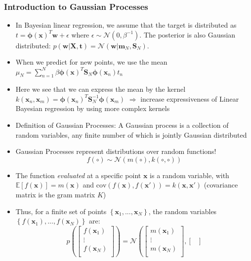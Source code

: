 \subsubsection{Introduction to Gaussian Processes}
\begin{itemize}
	\item In Bayesian linear regression, we assume that the target is distributed as $t=\bm{\phi}\left(\bm{x}\right)^T \bm{w} + \epsilon$ where $\epsilon\sim\mathcal{N}(0,\beta^{-1})$. The posterior is also Gaussian distributed: $p(\bm{w}|\bm{X},\bm{t}) = \mathcal{N}(\bm{w}|\bm{m}_N, \bm{S}_N)$.
	\item When we predict for new points, we use the mean $\mu_N = \sum_{n=1}^{N}\beta \bm{\phi}(\bm{x})^T \bm{S}_N \bm{\phi}(\bm{x}_n)t_n$ %
	\item Here we see that we can express the mean by the kernel $k(\bm{x}_n, \bm{x}_m) = \bm{\phi}(\bm{x}_n)^T \bm{S}_N^{-1} \bm{\phi}(\bm{x}_m)$ $\Rightarrow$ increase expressiveness of Linear Bayesian regression by using more complex kernels
	\item Definition of Gaussian Processes: A Gaussian process is a collection of random variables, any finite number of which is jointly Gaussian distributed
	\item Gaussian Processes represent distributions over random functions!
	$$f(\circ) \sim \mathcal{N}(m(\circ), k(\circ, \circ))$$
	\item The function \textit{evaluated} at a specific point $\bm{x}$ is a random variable, with $\mathbb{E}[f(\bm{x})] = m(\bm{x})$ and $\text{cov}(f(\bm{x}), f(\bm{x}')) = k(\bm{x}, \bm{x}')$ (covariance matrix is the gram matrix $K$)
	\item Thus, for a finite set of points $\left\{\bm{x}_1, ...,\bm{x}_N\right\}$, the random variables $\left\{f(\bm{x}_1), ...,f(\bm{x}_N)\right\}$ are:
	$$p\left(\begin{bmatrix}
	f(\bm{x}_1)\\
	\vdots\\
	f(\bm{x}_N)\\
	\end{bmatrix}\right) = \mathcal{N}\left(\begin{bmatrix}
	m(\bm{x}_1)\\
	\vdots\\
	m(\bm{x}_N)\\
	\end{bmatrix}, \begin{bmatrix}

\end{bmatrix}$$
\end{itemize}
